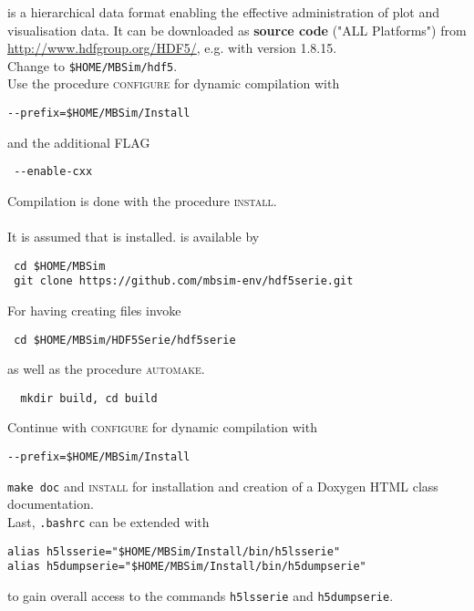 \subsubsection{\HDFSerie}
%
\paragraph{\HDF}
\HDF{} is a hierarchical data format enabling the effective administration of plot and visualisation data. It can be downloaded as \textbf{source code} ("ALL Platforms") from \url{http://www.hdfgroup.org/HDF5/}, e.g. with version 1.8.15.\\
%
Change to \texttt{\$HOME/MBSim/hdf5}.\\
%
Use the procedure \textsc{configure} for dynamic compilation with
\begin{verbatim}
--prefix=$HOME/MBSim/Install
\end{verbatim}
and the additional FLAG
\begin{verbatim}
 --enable-cxx
\end{verbatim}
Compilation is done with the procedure \textsc{install}.
%
\paragraph{\HDFSerie}
It is assumed that \FMatVec{} is installed. \HDFSerie is available by
\begin{verbatim}
 cd $HOME/MBSim
 git clone https://github.com/mbsim-env/hdf5serie.git
\end{verbatim}
For having \MBSim{} creating \HDF{} files invoke
\begin{verbatim}
 cd $HOME/MBSim/HDF5Serie/hdf5serie
\end{verbatim}
as well as the procedure \textsc{automake}.
\begin{verbatim}
  mkdir build, cd build
\end{verbatim}
Continue with \textsc{configure} for dynamic compilation with
\begin{verbatim}
--prefix=$HOME/MBSim/Install
\end{verbatim}
\texttt{make doc} and \textsc{install} for installation and creation of a Doxygen HTML class documentation.\\
%
Last, \texttt{.bashrc} can be extended with
\begin{verbatim}
alias h5lsserie="$HOME/MBSim/Install/bin/h5lsserie"
alias h5dumpserie="$HOME/MBSim/Install/bin/h5dumpserie"
\end{verbatim}
to gain overall access to the commands \texttt{h5lsserie} and \texttt{h5dumpserie}.

